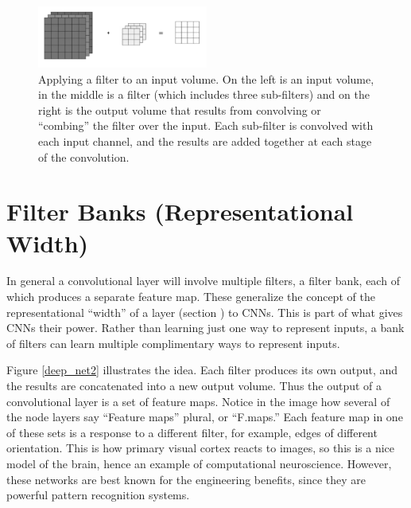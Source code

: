 \begin{figure}
\centering
\includegraphics[width=0.5\textwidth]{images/filterComb.png}
\caption[Todo.]{Applying a filter to an input volume. On the left is an input volume, in the middle is a filter (which includes three sub-filters) and on the right is the output volume that results from convolving or ``combing'' the filter over the input. Each sub-filter is convolved with each input channel, and the results are added together at each stage of the convolution. }
\label{combing}
\end{figure}

\section{Filter Banks (Representational Width)}


In general a convolutional layer will involve multiple filters, a filter bank, each of which produces a separate feature map. These generalize the concept of the representational ``width'' of a layer (section ) to CNNs. This is part of what gives CNNs their power. Rather than learning just one way to represent inputs, a bank of filters can learn multiple complimentary ways to represent inputs.

 Figure \ref{deep_net2} illustrates the idea. Each filter produces its own output, and the results are concatenated into a new output volume.  Thus the output of a convolutional layer is a set of feature maps. Notice in the image how several of the node layers say ``Feature maps'' plural, or ``F.maps.'' Each feature map in one of these sets is a response to a different filter, for example, edges of different orientation. This is how primary visual cortex reacts to images, so this is a nice model of the brain, hence an example of computational  neuroscience. However, these networks are best known for the engineering benefits, since they are powerful pattern recognition systems.

